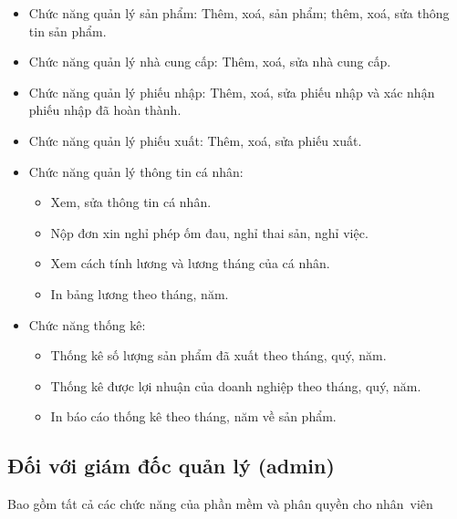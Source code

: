 \documentclass[a4paper,12pt]{report}
\begin{document}
\vspace{0.8em}

\begin{itemize}
    \item Chức năng quản lý sản phẩm: Thêm, xoá, sản phẩm; thêm, xoá, sửa thông tin sản phẩm.
    \item Chức năng quản lý nhà cung cấp: Thêm, xoá, sửa nhà cung cấp.
    \item Chức năng quản lý phiếu nhập: Thêm, xoá, sửa phiếu nhập và xác nhận phiếu nhập đã hoàn thành.
    \item Chức năng quản lý phiếu xuất: Thêm, xoá, sửa phiếu xuất.
    \item Chức năng quản lý thông tin cá nhân:
          \begin{itemize}
              \item Xem, sửa thông tin cá nhân.
              \item Nộp đơn xin nghỉ phép ốm đau, nghỉ thai sản, nghỉ việc.
              \item Xem cách tính lương và lương tháng của cá nhân.
              \item In bảng lương theo tháng, năm.
          \end{itemize}
    \item Chức năng thống kê:
          \begin{itemize}
              \item Thống kê số lượng sản phẩm đã xuất theo tháng, quý, năm.
              \item Thống kê được lợi nhuận của doanh nghiệp theo tháng, quý, năm.
              \item In báo cáo thống kê theo tháng, năm về sản phẩm.
          \end{itemize}
\end{itemize}
\subsection{Đối với giám đốc quản lý (admin)}
\quad Bao gồm tất cả các chức năng của phần mềm và phân quyền cho nhân~viên
\end{document}
